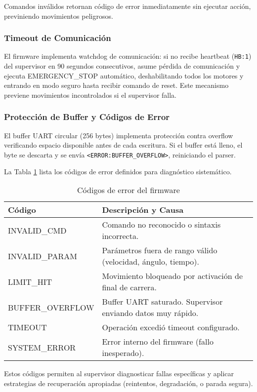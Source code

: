 Comandos inválidos retornan código de error inmediatamente sin ejecutar acción, previniendo movimientos peligrosos.

\subsubsection{Timeout de Comunicación}

El firmware implementa watchdog de comunicación: si no recibe heartbeat (\texttt{HB:1}) del supervisor en 90 segundos consecutivos, asume pérdida de comunicación y ejecuta EMERGENCY\_STOP automático, deshabilitando todos los motores y entrando en modo seguro hasta recibir comando de reset. Este mecanismo previene movimientos incontrolados si el supervisor falla.

\subsubsection{Protección de Buffer y Códigos de Error}

El buffer UART circular (256 bytes) implementa protección contra overflow verificando espacio disponible antes de cada escritura. Si el buffer está lleno, el byte se descarta y se envía \texttt{<ERROR:BUFFER\_OVERFLOW>}, reiniciando el parser.

La Tabla \ref{tab:codigos_error} lista los códigos de error definidos para diagnóstico sistemático.

\begin{table}[H]
\centering
\caption{Códigos de error del firmware}
\label{tab:codigos_error}
\begin{tabular}{|l|p{9cm}|}
\hline
\textbf{Código} & \textbf{Descripción y Causa} \\
\hline
INVALID\_CMD & Comando no reconocido o sintaxis incorrecta. \\
\hline
INVALID\_PARAM & Parámetros fuera de rango válido (velocidad, ángulo, tiempo). \\
\hline
LIMIT\_HIT & Movimiento bloqueado por activación de final de carrera. \\
\hline
BUFFER\_OVERFLOW & Buffer UART saturado. Supervisor enviando datos muy rápido. \\
\hline
TIMEOUT & Operación excedió timeout configurado. \\
\hline
SYSTEM\_ERROR & Error interno del firmware (fallo inesperado). \\
\hline
\end{tabular}
\end{table}

Estos códigos permiten al supervisor diagnosticar fallas específicas y aplicar estrategias de recuperación apropiadas (reintentos, degradación, o parada segura).
